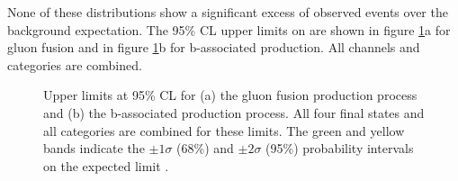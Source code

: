 None of these distributions show a significant excess of observed events over the background
expectation. The
95\% CL upper limits on \xsbr are shown in figure \ref{fig:mssm_results_limits}a
for gluon fusion and in figure \ref{fig:mssm_results_limits}b for b-associated
production. All channels and categories are combined. 
\begin{figure}[h!]
\begin{center}
\end{center}
\caption[Upper limits at 95\% CL for the gluon fusion production process and the
b-associated production process, combining all final states and categories.]{Upper limits at 95\% CL for (a) the gluon fusion production
process and (b) the b-associated production process. All four final states and 
all categories are combined for these limits. The green and yellow bands indicate
the $\pm 1\sigma$ (68\%) and $\pm 2\sigma$ (95\%) probability intervals on the expected limit \cite{CMS-PAS-HIG-16-037}.}
\label{fig:mssm_results_limits}
\end{figure}

